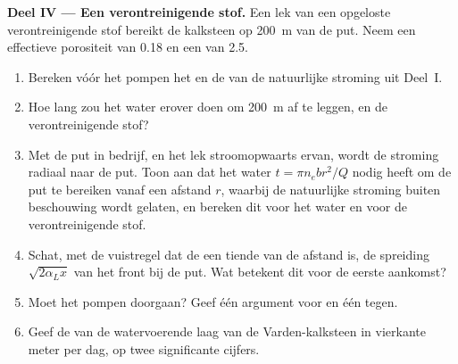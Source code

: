 \begin{problem}
\medskip\noindent\textbf{Deel IV --- Een verontreinigende stof.} Een lek van een opgeloste
verontreinigende stof bereikt de kalksteen op \qty{200}{m} van de put. Neem een
effectieve porositeit van 0.18 en een  van 2.5.
\begin{enumerate}[resume]
\item Bereken vóór het pompen het  en de
   van de natuurlijke stroming uit Deel~I.
\item Hoe lang zou het water erover doen om \qty{200}{m} af te leggen, en de
  verontreinigende stof?
\item Met de put in bedrijf, en het lek stroomopwaarts ervan, wordt de stroming
  radiaal naar de put. Toon aan dat het water $t = \pi n_e b
  r^2/Q$ nodig heeft om de put te bereiken vanaf een afstand $r$, waarbij de natuurlijke
  stroming buiten beschouwing wordt gelaten, en bereken dit voor het water en voor de verontreinigende stof.
\item Schat, met de vuistregel dat de  een tiende van de afstand is,
  de spreiding $\sqrt{2\alpha_Lx}$ van het front bij de put. Wat
  betekent dit voor de eerste aankomst?
\item Moet het pompen doorgaan? Geef één argument voor en één tegen.
\item Geef de  van de watervoerende laag van de Varden-kalksteen in vierkante
  meter per dag, op twee significante cijfers.
\end{enumerate}
\end{problem}

